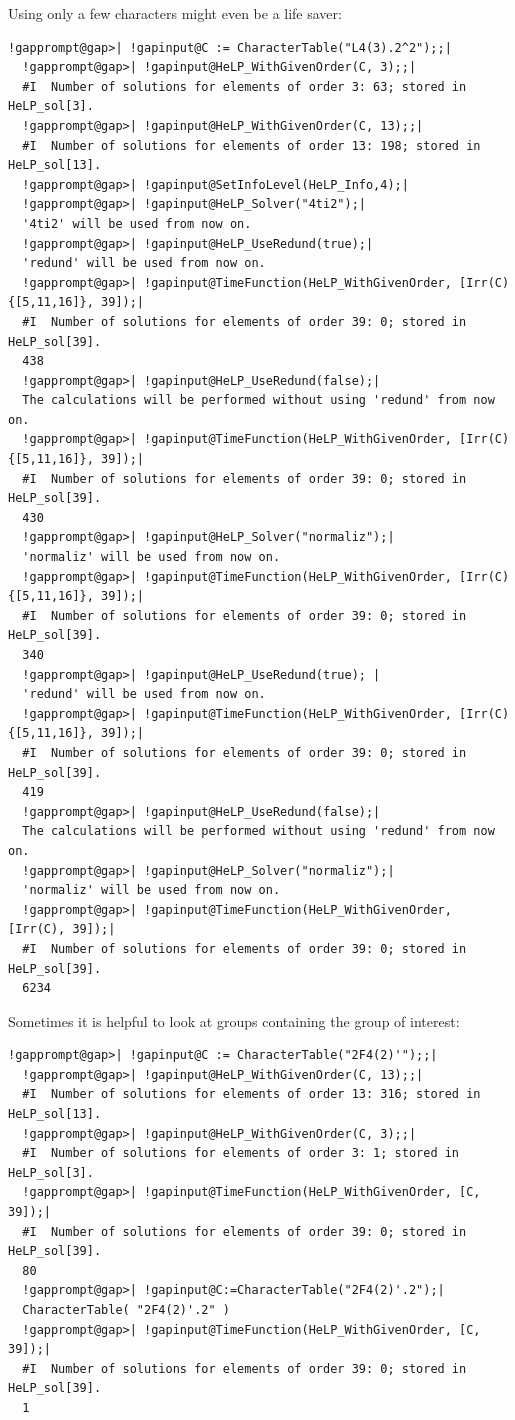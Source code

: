 \documentclass[a4paper,11pt]{report}
\begin{document}
{{ Using only a few characters might even be a life saver: 
\begin{Verbatim}[commandchars=!@|,fontsize=\small,frame=single,label=Example]
  !gapprompt@gap>| !gapinput@C := CharacterTable("L4(3).2^2");;|
  !gapprompt@gap>| !gapinput@HeLP_WithGivenOrder(C, 3);;|
  #I  Number of solutions for elements of order 3: 63; stored in HeLP_sol[3].
  !gapprompt@gap>| !gapinput@HeLP_WithGivenOrder(C, 13);;|
  #I  Number of solutions for elements of order 13: 198; stored in HeLP_sol[13].
  !gapprompt@gap>| !gapinput@SetInfoLevel(HeLP_Info,4);|
  !gapprompt@gap>| !gapinput@HeLP_Solver("4ti2");|
  '4ti2' will be used from now on.
  !gapprompt@gap>| !gapinput@HeLP_UseRedund(true);|
  'redund' will be used from now on.
  !gapprompt@gap>| !gapinput@TimeFunction(HeLP_WithGivenOrder, [Irr(C){[5,11,16]}, 39]);|
  #I  Number of solutions for elements of order 39: 0; stored in HeLP_sol[39].  
  438
  !gapprompt@gap>| !gapinput@HeLP_UseRedund(false);|
  The calculations will be performed without using 'redund' from now on.
  !gapprompt@gap>| !gapinput@TimeFunction(HeLP_WithGivenOrder, [Irr(C){[5,11,16]}, 39]);|
  #I  Number of solutions for elements of order 39: 0; stored in HeLP_sol[39].  
  430
  !gapprompt@gap>| !gapinput@HeLP_Solver("normaliz");|
  'normaliz' will be used from now on.
  !gapprompt@gap>| !gapinput@TimeFunction(HeLP_WithGivenOrder, [Irr(C){[5,11,16]}, 39]);|
  #I  Number of solutions for elements of order 39: 0; stored in HeLP_sol[39].  
  340
  !gapprompt@gap>| !gapinput@HeLP_UseRedund(true); |
  'redund' will be used from now on.
  !gapprompt@gap>| !gapinput@TimeFunction(HeLP_WithGivenOrder, [Irr(C){[5,11,16]}, 39]);|
  #I  Number of solutions for elements of order 39: 0; stored in HeLP_sol[39].  
  419
  !gapprompt@gap>| !gapinput@HeLP_UseRedund(false);|
  The calculations will be performed without using 'redund' from now on.
  !gapprompt@gap>| !gapinput@HeLP_Solver("normaliz");|
  'normaliz' will be used from now on.
  !gapprompt@gap>| !gapinput@TimeFunction(HeLP_WithGivenOrder, [Irr(C), 39]);|
  #I  Number of solutions for elements of order 39: 0; stored in HeLP_sol[39].  
  6234
\end{Verbatim}
 

 Sometimes it is helpful to look at groups containing the group of interest: 
\begin{Verbatim}[commandchars=!@|,fontsize=\small,frame=single,label=Example]
  !gapprompt@gap>| !gapinput@C := CharacterTable("2F4(2)'");;|
  !gapprompt@gap>| !gapinput@HeLP_WithGivenOrder(C, 13);;|
  #I  Number of solutions for elements of order 13: 316; stored in HeLP_sol[13].
  !gapprompt@gap>| !gapinput@HeLP_WithGivenOrder(C, 3);;|
  #I  Number of solutions for elements of order 3: 1; stored in HeLP_sol[3].
  !gapprompt@gap>| !gapinput@TimeFunction(HeLP_WithGivenOrder, [C, 39]);|
  #I  Number of solutions for elements of order 39: 0; stored in HeLP_sol[39].
  80
  !gapprompt@gap>| !gapinput@C:=CharacterTable("2F4(2)'.2");|
  CharacterTable( "2F4(2)'.2" )
  !gapprompt@gap>| !gapinput@TimeFunction(HeLP_WithGivenOrder, [C, 39]);|
  #I  Number of solutions for elements of order 39: 0; stored in HeLP_sol[39].
  1
\end{Verbatim}
 

}}
\end{document}

